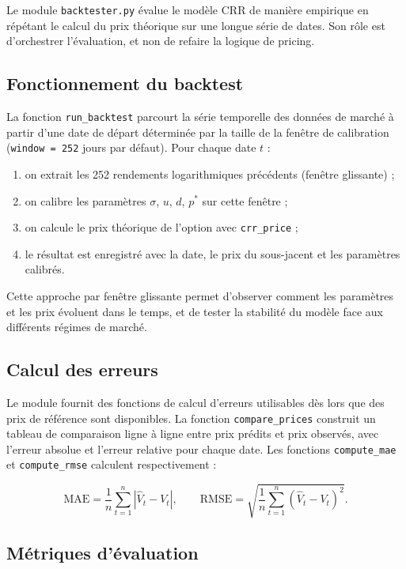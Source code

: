 \documentclass[11pt]{report}
\begin{document}
Le module \texttt{backtester.py} évalue le modèle CRR de manière empirique
en répétant le calcul du prix théorique sur une longue série de dates.
Son rôle est d'orchestrer l'évaluation, et non de refaire la logique de pricing.

\subsection{Fonctionnement du backtest}

La fonction \texttt{run\_backtest} parcourt la série temporelle des données
de marché à partir d'une date de départ déterminée par la taille de la fenêtre
de calibration (\texttt{window = 252} jours par défaut). Pour chaque date $t$ :

\begin{enumerate}
    \item on extrait les 252 rendements logarithmiques précédents (fenêtre glissante) ;
    \item on calibre les paramètres $\sigma$, $u$, $d$, $p^*$ sur cette fenêtre ;
    \item on calcule le prix théorique de l'option avec \texttt{crr\_price} ;
    \item le résultat est enregistré avec la date, le prix du sous-jacent et les paramètres calibrés.
\end{enumerate}

Cette approche par fenêtre glissante permet d'observer comment les paramètres
et les prix évoluent dans le temps, et de tester la stabilité du modèle
face aux différents régimes de marché.

\subsection{Calcul des erreurs}

Le module fournit des fonctions de calcul d'erreurs utilisables dès lors que
des prix de référence sont disponibles. La fonction \texttt{compare\_prices}
construit un tableau de comparaison ligne à ligne entre prix prédits et
prix observés, avec l'erreur absolue et l'erreur relative pour chaque date.
Les fonctions \texttt{compute\_mae} et \texttt{compute\_rmse} calculent
respectivement :

\[
\text{MAE} = \frac{1}{n}\sum_{t=1}^{n} |\hat{V}_t - V_t|,
\qquad
\text{RMSE} = \sqrt{\frac{1}{n}\sum_{t=1}^{n} (\hat{V}_t - V_t)^2}.
\]

\subsection{Métriques d'évaluation}
\end{document}

